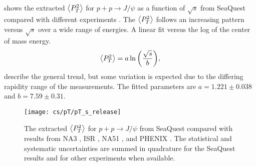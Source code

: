 \documentclass[../main.tex]{subfiles}
\begin{document}
 shows the extracted $\expval{P_T^2}$ for $p+p\to J/\psi$ as a function
of $\sqrt{s}$ from SeaQuest compared with different experiments
\cite{badier1983,clark1978,drapier1998,acharya2020}. The $\expval{P_T^2}$ follows an
increasing pattern versus $\sqrt{s}$ over a wide range of energies.
A linear fit versus the log of the center of mass energy\cite{acharya2020}.
\begin{equation}
	\expval{P_T^2}=a\ln{\left( \frac{\sqrt{s}}{b} \right)},
\end{equation}
describe the general trend, but some variation is expected due to the differing
rapidity range of the measurements.
The fitted parameters are $a=1.221\pm0.038$ and $b=7.59\pm0.31$. 
\begin{figure}
	\centering
	\texttt{[image: cs/pT/pT\_s\_release]}
	\caption{The extracted $\expval{P_T^2}$ for $p+p\rightarrow J/\psi$ from SeaQuest compared
		with results from NA3 \cite{badier1983}, ISR \cite{clark1978}, NA51 \cite{drapier1998},
		and PHENIX \cite{acharya2020}. The statistical and systematic uncertainties are summed in quadrature for
		the SeaQuest results and for other experiments when available.   }
	\label{fig:pT_s}
\end{figure}

\FloatBarrier

\ifSubfilesClassLoaded{ \printbibliography[heading=bibintoc,title={References}]}{}
\end{document}
